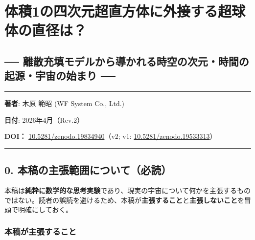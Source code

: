 \documentclass[a4paper,11pt]{ltjsarticle}
\theoremstyle{definition}
\begin{document}
\section{体積1の四次元超直方体に外接する超球体の直径は？}\label{ux4f53ux7a4d1ux306eux56dbux6b21ux5143ux8d85ux76f4ux65b9ux4f53ux306bux5916ux63a5ux3059ux308bux8d85ux7403ux4f53ux306eux76f4ux5f84ux306f}

\subsection{──
離散充填モデルから導かれる時空の次元・時間の起源・宇宙の始まり
──}\label{ux96e2ux6563ux5145ux586bux30e2ux30c7ux30ebux304bux3089ux5c0eux304bux308cux308bux6642ux7a7aux306eux6b21ux5143ux6642ux9593ux306eux8d77ux6e90ux5b87ux5b99ux306eux59cbux307eux308a}

\begin{center}\rule{0.5\linewidth}{0.5pt}\end{center}

\textbf{著者}: 木原 範昭 (WF System Co., Ltd.)

\textbf{日付}: 2026年4月（Rev.2）

\textbf{DOI：}
\href{https://doi.org/10.5281/zenodo.19834940}{10.5281/zenodo.19834940}（v2;
v1:
\href{https://doi.org/10.5281/zenodo.19533313}{10.5281/zenodo.19533313}）

\begin{center}\rule{0.5\linewidth}{0.5pt}\end{center}

\subsection{0.
本稿の主張範囲について（必読）}\label{ux672cux7a3fux306eux4e3bux5f35ux7bc4ux56f2ux306bux3064ux3044ux3066ux5fc5ux8aad}

本稿は\textbf{純粋に数学的な思考実験}であり、現実の宇宙について何かを主張するものではない。読者の誤読を避けるため、本稿が\textbf{主張すること}と\textbf{主張しないこと}を冒頭で明確にしておく。

\subsubsection{本稿が主張すること}\label{ux672cux7a3fux304cux4e3bux5f35ux3059ux308bux3053ux3068}
\end{document}
